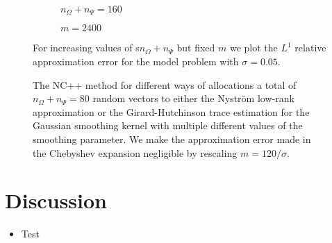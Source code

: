 \documentclass[12pt]{article}
\begin{document}
\begin{figure}[ht]
    \begin{subfigure}[b]{0.49\columnwidth}
        
        \caption{$n_{\Omega} + n_{\Psi} = 160$}
        \label{convergence-randvec}
    \end{subfigure}
    \begin{subfigure}[b]{0.49\columnwidth}
        
        \caption{$m = 2400$}
        \label{fig:convergence-degree}
    \end{subfigure}
    \caption{For increasing values of s$n_{\Omega} + n_{\Psi}$ but fixed $m$ we plot the $L^1$ relative approximation error for the model problem with $\sigma=0.05$.}
    \label{fig:convergence}
\end{figure}


\begin{figure}[ht]
    \centering
    
    \caption{The NC++ method for different ways of allocations a 
    total of $n_{\Omega} + n_{\Psi}=80$ random vectors
    to either the Nystr\"om low-rank approximation or the Girard-Hutchinson trace estimation
    for the Gaussian smoothing kernel with multiple different values of
    the smoothing parameter. We make the approximation error made in the
    Chebyshev expansion negligible by rescaling $m=120 / \sigma$.}
    \label{fig:matvec-mix}
\end{figure}


\section{Discussion}
\label{sec:discussion}

\begin{itemize}
    \item Test
\end{itemize}

\clearpage




\tableofcontents
\end{document}
